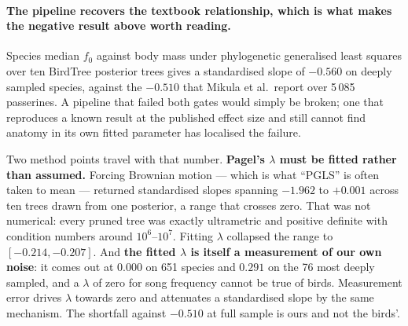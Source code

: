 \documentclass[10pt,twocolumn,a4paper]{article}
\begin{document}
\paragraph{The pipeline recovers the textbook relationship, which is what makes the negative
result above worth reading.} Species median $f_0$ against body mass under phylogenetic
generalised least squares over ten BirdTree posterior trees gives a standardised slope of
$-0.560$ on deeply sampled species, against the $-0.510$ that Mikula et al.\ report over
5\,085 passerines. A pipeline that failed both gates would simply be broken; one that
reproduces a known result at the published effect size and still cannot find anatomy in its
own fitted parameter has localised the failure.

Two method points travel with that number. \textbf{Pagel's $\lambda$ must be fitted rather
than assumed.} Forcing Brownian motion --- which is what ``PGLS'' is often taken to mean ---
returned standardised slopes spanning $-1.962$ to $+0.001$ across ten trees drawn from one
posterior, a range that crosses zero. That was not numerical: every pruned tree was exactly
ultrametric and positive definite with condition numbers around $10^{6}$--$10^{7}$. Fitting
$\lambda$ collapsed the range to $[-0.214, -0.207]$. And \textbf{the fitted $\lambda$ is
itself a measurement of our own noise}: it comes out at $0.000$ on 651 species and $0.291$ on
the 76 most deeply sampled, and a $\lambda$ of zero for song frequency cannot be true of
birds. Measurement error drives $\lambda$ towards zero and attenuates a standardised slope by
the same mechanism. The shortfall against $-0.510$ at full sample is ours and not the birds'.
\end{document}
